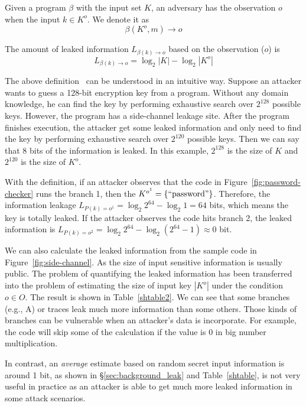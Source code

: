 \begin{mydef}
    \label{def}
    Given a program $\beta$ with the input set $K$,
    an adversary has the observation $o$ when the input $k{\in}K^o$.
    We denote it as
    $$\beta(K^o, m) \rightarrow	o$$

    The amount of leaked information $L_{\beta(k)\rightarrow o}$ based on the observation ($o$) is
    $$L_{\beta(k)\rightarrow o} = \log_2{|K|} - \log_2{|K^o|}$$
\end{mydef}

The above definition~\cite{AskarovC12} can be understood in an intuitive way. Suppose an attacker
wants to guess a 128-bit encryption key from a program.
Without any domain knowledge,
he can find the key by performing exhaustive search over $2^{128}$ possible keys.
However, the program has a side-channel leakage site. After the program finishes execution, the
attacker get some leaked information and only need to find the key by performing
exhaustive search over $2^{120}$ possible keys. Then we can say that 8 bits of the information
is leaked. In this example, $2^{128}$ is the size of $K$ and $2^{120}$ is the size of $K^o$.


With the definition, if an attacker observes that the code in
Figure~\ref{fig:password-checker} runs the branch 1, then the $K^{o^{1}} =
    \{\mathrm{``password"}\}$. Therefore, the information leakage $L_{P(k)=o^{1}} =
    \log_2{2^{64}} - \log_2{1} = 64$ bits, which means the key is totally leaked. If
the attacker observes the code hits branch 2, the leaked information is
$L_{P(k)=o^{2}} = \log_2{2^{64}} - \log_2{(2^{64}-1)} \approx 0$ bit.


We can also calculate the leaked information from the sample code in
Figure~\ref{fig:side-channel}. As the size of input sensitive information is
usually public. The problem of quantifying the leaked information has been
transferred into the problem of estimating the size of input key $|K^o|$ under
the condition $o \in O$. The result is shown in Table~\ref{shtable2}. We can see
that some branches (e.g., A) or traces leak much more information than some others.
Those kinds of branches can be vulnerable when an attacker's data is incorporate.
For example, the code will skip some of the calculation if the value is 0 in big
number multiplication.

In
contrast, an \emph{average} estimate based on random secret input information is around
1 bit, as shown in \S\ref{sec:background_leak} and Table~\ref{shtable}, is
not very useful in practice as an attacker is able to get much more leaked
information in some attack scenarios.

